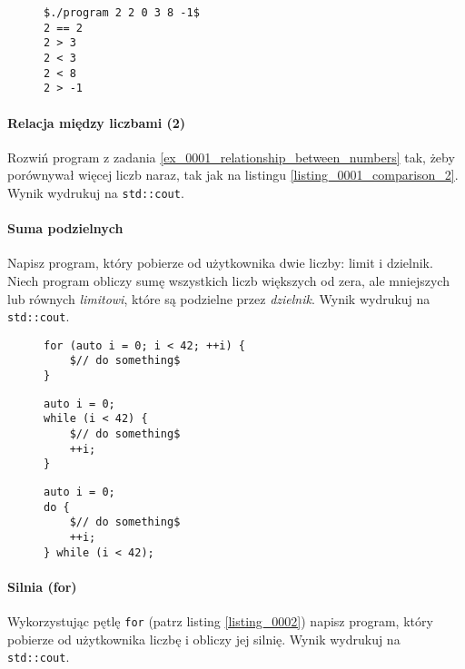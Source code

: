 \documentclass[11pt,a4paper,titlepage,onecolumn]{article}
\begin{document}
\begin{figure}[!htp]
\begin{lstlisting}[caption={relacja między liczbami (2)},
    captionpos=b,
    label=listing_0001_comparison_2]
$./program 2 2 0 3 8 -1$
2 == 2
2 > 3
2 < 3
2 < 8
2 > -1
\end{lstlisting}
\end{figure}

\paragraph{Relacja między liczbami (2)} Rozwiń program z zadania
\ref{ex_0001_relationship_between_numbers} tak, żeby porównywał więcej liczb
naraz, tak jak na listingu \ref{listing_0001_comparison_2}.
Wynik wydrukuj na \texttt{std::cout}.

\paragraph{Suma podzielnych} Napisz program, który pobierze od użytkownika dwie
liczby: limit i dzielnik. Niech program obliczy sumę wszystkich liczb większych
od zera, ale mniejszych lub równych \emph{limitowi}, które są podzielne przez
\emph{dzielnik}.
Wynik wydrukuj na \texttt{std::cout}.

\begin{figure}[!htp]
\begin{lstlisting}[caption={pętla for},
    captionpos=b,
    label=listing_0002]
for (auto i = 0; i < 42; ++i) {
    $// do something$
}
\end{lstlisting}
\end{figure}

\begin{figure}[!htp]
\begin{lstlisting}[caption={pętla while},
    captionpos=b,
    label=listing_0003]
auto i = 0;
while (i < 42) {
    $// do something$
    ++i;
}
\end{lstlisting}
\end{figure}

\begin{figure}[!htp]
\begin{lstlisting}[caption={pętla do-while},
    captionpos=b,
    label=listing_0004]
auto i = 0;
do {
    $// do something$
    ++i;
} while (i < 42);
\end{lstlisting}
\end{figure}

\paragraph{Silnia (for)} Wykorzystując pętlę \texttt{for} (patrz listing
\ref{listing_0002}) napisz program, który pobierze od użytkownika liczbę i
obliczy jej silnię. Wynik wydrukuj na \texttt{std::cout}.
\end{document}
